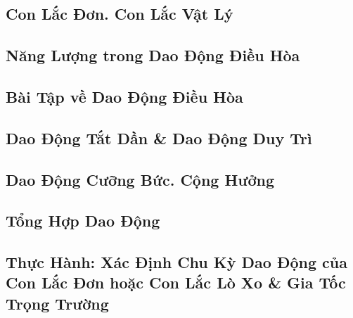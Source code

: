 \documentclass{article}
\numberwithin{equation}{section}
\begin{document}
\subsection{Con Lắc Đơn. Con Lắc Vật Lý}


\subsection{Năng Lượng trong Dao Động Điều Hòa}


\subsection{Bài Tập về Dao Động Điều Hòa}


\subsection{Dao Động Tắt Dần \& Dao Động Duy Trì}


\subsection{Dao Động Cưỡng Bức. Cộng Hưởng}


\subsection{Tổng Hợp Dao Động}


\subsection{Thực Hành: Xác Định Chu Kỳ Dao Động của Con Lắc Đơn hoặc Con Lắc Lò Xo \& Gia Tốc Trọng Trường}

\end{document}
